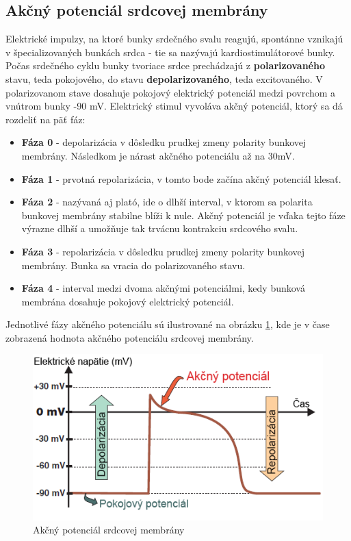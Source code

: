 \subsection{Akčný potenciál srdcovej membrány}

 Elektrické impulzy, na ktoré bunky srdečného svalu reagujú, spontánne vznikajú v špecializovaných bunkách srdca - tie sa nazývajú kardiostimulátorové bunky. Počas srdečného cyklu bunky tvoriace srdce prechádzajú z \textbf{polarizovaného} stavu, teda pokojového, do stavu \textbf{depolarizovaného}, teda excitovaného. V polarizovanom stave dosahuje pokojový elektrický potenciál medzi povrchom a vnútrom bunky -90 mV.\cite{Bada2010} Elektrický stimul vyvoláva akčný potenciál, ktorý sa dá rozdeliť na päť fáz:
\begin{itemize}
    \item \textbf{Fáza 0} - depolarizácia v dôsledku prudkej zmeny polarity bunkovej membrány. Následkom je nárast akčného potenciálu až na 30mV.
    \item \textbf{Fáza 1} - prvotná repolarizácia, v tomto bode začína akčný potenciál klesať.
    \item \textbf{Fáza 2} - nazývaná aj plató, ide o dlhší interval, v ktorom sa polarita bunkovej membrány stabilne blíži k nule. Akčný potenciál je vďaka tejto fáze výrazne dlhší a umožňuje tak trvácnu kontrakciu srdcového svalu.
    \item \textbf{Fáza 3} - repolarizácia v dôsledku prudkej zmeny polarity bunkovej membrány. Bunka sa vracia do polarizovaného stavu.
    \item \textbf{Fáza 4} - interval medzi dvoma akčnými potenciálmi, kedy bunková membrána dosahuje pokojový elektrický potenciál. 
\end{itemize}

Jednotlivé fázy akčného potenciálu sú ilustrované na obrázku \ref{fig:action_potential_voltage}, kde je v čase zobrazená hodnota akčného potenciálu srdcovej membrány.\cite{Rooke2021TheEA}\cite{Bada2010}

\begin{figure}[H]
    \centering
    \includegraphics[scale=0.45]{img/action-potential-voltage.png}
    \caption{Akčný potenciál srdcovej membrány\cite{Blahút_2017}}
    \label{fig:action_potential_voltage}
\end{figure}


